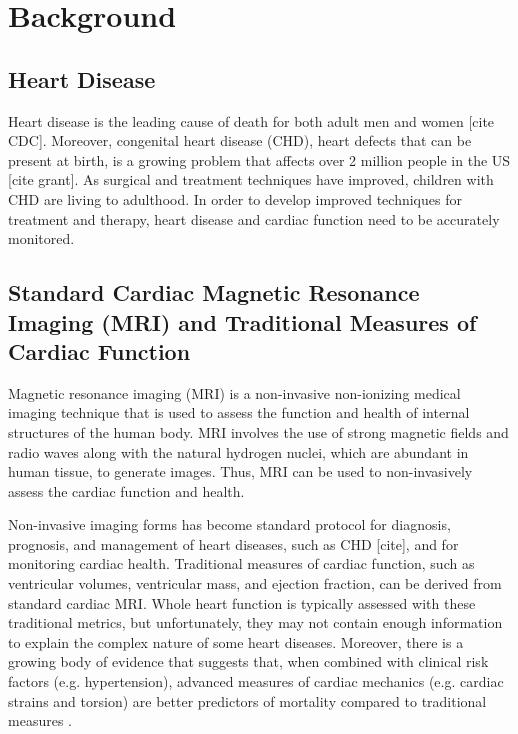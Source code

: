 \chapter{Background}

\section{Heart Disease}
	Heart disease is the leading cause of death for both adult men and women [cite CDC]. Moreover, congenital heart disease (CHD), heart defects that can be present at birth, is a growing problem that affects over 2 million people in the US [cite grant]. As surgical and treatment techniques have improved, children with CHD are living to adulthood. In order to develop improved techniques for treatment and therapy, heart disease and cardiac function need to be accurately monitored.

\section{Standard Cardiac Magnetic Resonance Imaging (MRI) and Traditional Measures of Cardiac Function}
	Magnetic resonance imaging (MRI) is a non-invasive non-ionizing medical imaging technique that is used to assess the function and health of internal structures of the human body. MRI involves the use of strong magnetic fields and radio waves along with the natural hydrogen nuclei, which are abundant in human tissue, to generate images. Thus, MRI can be used to non-invasively assess the cardiac function and health.

	Non-invasive imaging forms has become standard protocol for diagnosis, prognosis, and management of heart diseases, such as CHD [cite], and for monitoring cardiac health. Traditional measures of cardiac function, such as ventricular volumes, ventricular mass, and ejection fraction, can be derived from standard cardiac MRI. Whole heart function is typically assessed with these traditional metrics, but unfortunately, they may not contain enough information to explain the complex nature of some heart diseases. Moreover, there is a growing body of evidence that suggests that, when combined with clinical risk factors (e.g. hypertension), advanced measures of cardiac mechanics (e.g. cardiac strains and torsion) are better predictors of mortality compared to traditional measures \cite{Stanton2009}.

